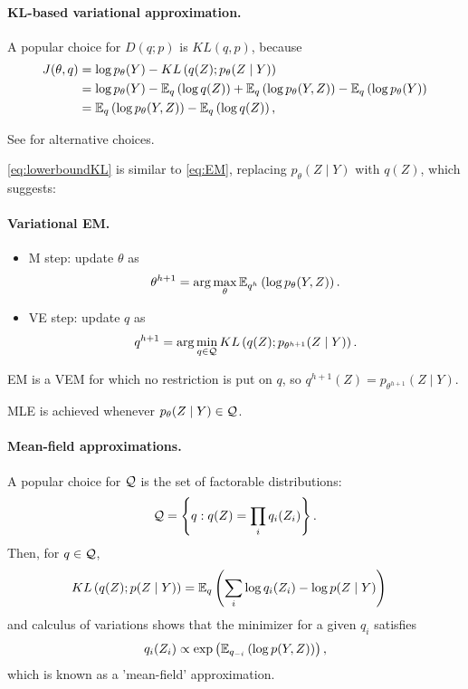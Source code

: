\jump \paragraph{KL-based variational approximation.} A popular choice for $D(q; p)$ is $KL(q, p)$, because
\begin{align} \label{eq:lowerboundKL}
J(\theta, q) 
& = \log p_\theta(Y) - KL\left(q(Z); p_\theta(Z \mid Y)\right) \nonumber \\
& = \log p_\theta(Y) - \mathbb E_q\left(\log q(Z)\right) + \mathbb E_q\left(\log p_\theta(Y, Z)\right)  - \mathbb E_q\left(\log p_\theta(Y)\right)  \nonumber \\
& = \mathbb E_q \left(\log p_\theta(Y, Z)\right) - \mathbb E_q \left(\log q(Z)\right), 
\end{align}

\ra See \cite{Min05} for alternative choices.

\ra \eqref{eq:lowerboundKL} is similar to \eqref{eq:EM}, replacing $p_\theta(Z \mid Y)$ with $q(Z)$, which suggests:

\jump \paragraph{Variational EM.}
\begin{itemize}
\item M step: update $\theta$ as
$$
\theta^{h+1} = \arg\max_\theta \mathbb E_{q^h} \left(\log p_\theta(Y, Z)\right).
$$
\item VE step: update $q$ as
$$
q^{h+1} = \arg\min_{q \in \mathcal{Q}} KL\left(q(Z); p_{\theta^{h+1}}(Z \mid Y)\right).
$$
\end{itemize}

\ra EM is a VEM for which no restriction is put on $q$, so $q^{h+1}(Z) = p_{\theta^{h+1}}(Z \mid Y)$.

\ra MLE is achieved whenever $p_\theta(Z \mid Y) \in \mathcal{Q}$.


\jump \paragraph{Mean-field approximations.} A popular choice for $\mathcal{Q}$ is the set of factorable distributions:
$$
\mathcal{Q} = \left\{q: q(Z) = \prod_i q_i(Z_i)\right\}.
$$
Then, for $q \in \mathcal{Q}$, 
\begin{align*}
KL\left(q(Z); p(Z \mid Y)\right)
& = \mathbb E_q\left(\sum_i \log q_i(Z_i) - \log p(Z \mid Y)\right)
\end{align*}
and calculus of variations shows that the minimizer for a given $q_i$ satisfies \citep{Bea03} 
\begin{equation} \label{eq:meanfield}
q_i(Z_i) \propto \exp\left(\mathbb E_{q_{-i}}\left(\log p(Y, Z)\right)\right),
\end{equation}
which is known as a 'mean-field' approximation.

